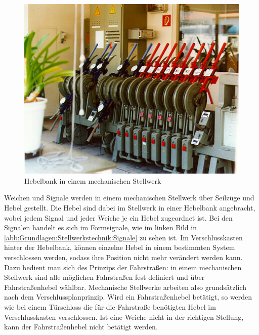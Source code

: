 \begin{figure}[H]
    \centering
    \includegraphics[width=.8\textwidth]{Assets/Images/2-Grundlagen/Mechanisches-Stellwerk-Hebelbank.jpg}
    \caption{Hebelbank in einem mechanischen Stellwerk~\cite{bib:stellwerke.de:Einheit}}\label{abb:Grundlagen:Stellwerkstechnik:Mechanische-Stellwerke:Hebelbank}
\end{figure}

Weichen und Signale werden in einem mechanischen Stellwerk über Seilzüge und Hebel gestellt. Die Hebel sind dabei im Stellwerk in einer Hebelbank angebracht, wobei jedem Signal und jeder Weiche je ein Hebel zugeordnet ist. Bei den Signalen handelt es sich im Formsignale, wie im linken Bild in \autoref{abb:Grundlagen:Stellwerkstechnik:Signale} zu sehen ist.
Im Verschlusskasten hinter der Hebelbank, können einzelne Hebel in einem bestimmten System verschlossen werden, sodass ihre Position nicht mehr verändert werden kann. Dazu bedient man sich des Prinzips der Fahrstraßen: in einem mechanischen Stellwerk sind alle möglichen Fahrstraßen fest definiert und über Fahrstraßenhebel wählbar. Mechanische Stellwerke arbeiten also grundsätzlich nach dem Verschlussplanprinzip. Wird ein Fahrstraßenhebel betätigt, so werden wie bei einem Türschloss die für die Fahrstraße benötigten Hebel im Verschlusskasten verschlossen. Ist eine Weiche nicht in der richtigen Stellung, kann der Fahrstraßenhebel nicht betätigt werden.~\cite[][S.173 ff.]{bib:Sicherung-des-Schienenverkehrs}

